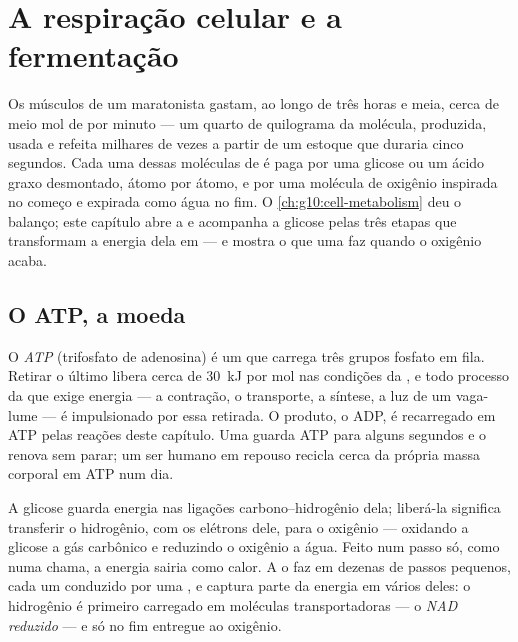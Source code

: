 \chapter{A respiração celular e a fermentação}\label{ch:g12:respiration-fermentation}

Os músculos de um maratonista gastam, ao longo de três horas e meia,
cerca de meio mol de  por minuto --- um quarto de quilograma da
molécula, produzida, usada e refeita milhares de vezes a partir de um
estoque que duraria cinco segundos. Cada uma dessas moléculas de  é
paga por uma glicose ou um ácido graxo desmontado, átomo por átomo, e
por uma molécula de oxigênio inspirada no começo e expirada como água
no fim. O \cref{ch:g10:cell-metabolism} deu o balanço; este capítulo
abre a  e acompanha a glicose pelas três etapas que
transformam a energia dela em  --- e mostra o que uma  faz
quando o oxigênio acaba.

\section{O ATP, a moeda}

\begin{definition}[ATP]\label{def:g12:respiration-fermentation:atp}
O \emph{ATP} (trifosfato de adenosina) é um  que
carrega três grupos fosfato em fila. Retirar o último libera cerca de
\qty{30}{kJ} por mol nas condições da , e todo processo da 
que exige energia --- a contração, o transporte, a síntese, a luz de um
vaga-lume --- é impulsionado por essa retirada. O produto, o ADP, é
recarregado em ATP pelas reações deste capítulo. Uma  guarda ATP
para alguns segundos e o renova sem parar; um ser humano em repouso
recicla cerca da própria massa corporal em ATP num dia.
\end{definition}

\begin{proposition}\label{prop:g12:respiration-fermentation:oxidation}
A glicose guarda energia nas ligações carbono--hidrogênio dela;
liberá-la significa transferir o hidrogênio, com os elétrons dele, para
o oxigênio --- oxidando a glicose a gás carbônico e reduzindo o
oxigênio a água. Feito num passo só, como numa chama, a energia sairia
como calor. A  o faz em dezenas de passos pequenos, cada um
conduzido por uma , e captura parte da energia em vários deles: o
hidrogênio é primeiro carregado em moléculas transportadoras --- o
\emph{NAD reduzido} --- e só no fim entregue ao oxigênio.
\end{proposition}
\admitted

